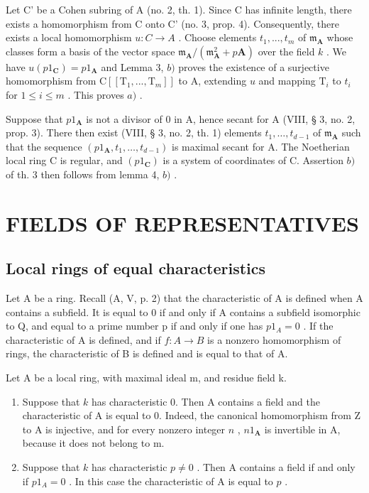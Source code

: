 Let C' be a Cohen subring of A (no. 2, th. 1). Since C has infinite length, there exists a homomorphism from C onto C' (no. 3, prop. 4). Consequently, there exists a local homomorphism \(u:C\to A\) . Choose elements \(t_{1},...,t_{m}\) of \(\mathfrak{m}_{\mathbf{A}}\) whose classes form a basis of the vector space \(\mathfrak{m}_{\mathbf{A}}/(\mathfrak{m}_{\mathbf{A}}^{2}+p\mathbf{A})\) over the field \(k\) . We have \(u(p1_{\mathbf{C}})=p1_{\mathbf{A}}\) and Lemma 3, \(b)\) proves the existence of a surjective homomorphism from \(\mathrm{C}[[\mathrm{T}_{1},..., \mathrm{T}_{m}]]\) to A, extending \(u\) and mapping \(\mathrm{T}_{i}\) to \(t_{i}\) for \(1\leqslant i\leqslant m\) . This proves \(a)\) .

Suppose that \(p1_{\mathbf{A}}\) is not a divisor of 0 in A, hence secant for A (VIII, § 3, no. 2, prop. 3). There then exist (VIII, § 3, no. 2, th. 1) elements \(t_1, \ldots, t_{d-1}\) of \(\mathfrak{m}_{\mathbf{A}}\) such that the sequence \((p1_{\mathbf{A}}, t_1, \ldots, t_{d-1})\) is maximal secant for A. The Noetherian local ring C is regular, and \((p1_{\mathbf{C}})\) is a system of coordinates of C. Assertion \(b)\) of th. 3 then follows from lemma 4, \(b)\) .

\section{FIELDS OF REPRESENTATIVES}

\subsection{Local rings of equal characteristics}

Let A be a ring. Recall (A, V, p. 2) that the characteristic of A is defined when A contains a subfield. It is equal to 0 if and only if A contains a subfield isomorphic to Q, and equal to a prime number p if and only if one has \(p1_{A} = 0\) . If the characteristic of A is defined, and if \(f: A \to B\) is a nonzero homomorphism of rings, the characteristic of B is defined and is equal to that of A.

Let A be a local ring, with maximal ideal m, and residue field k.

\begin{enumerate}
\def\labelenumi{\alph{enumi})}
\item
  Suppose that \(k\) has characteristic 0. Then A contains a field and the characteristic of A is equal to 0. Indeed, the canonical homomorphism from Z to A is injective, and for every nonzero integer \(n\) , \(n1_{\mathbf{A}}\) is invertible in A, because it does not belong to m.
\item
  Suppose that \(k\) has characteristic \(p \neq 0\) . Then A contains a field if and only if \(p1_{A} = 0\) . In this case the characteristic of A is equal to \(p\) .
\end{enumerate}

